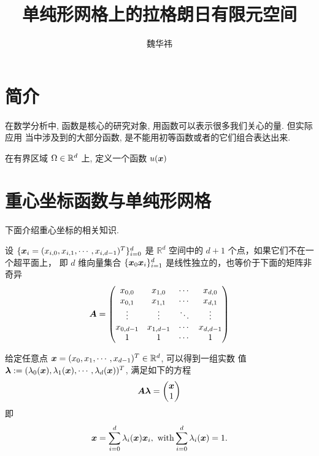 \documentclass{article}
\begin{document}
\title{单纯形网格上的拉格朗日有限元空间}
\author{魏华祎}
\date{\chntoday}
\maketitle
\section{简介}
在数学分析中, 函数是核心的研究对象, 用函数可以表示很多我们关心的量. 但实际应用
当中涉及到的大部分函数, 是不能用初等函数或者的它们组合表达出来. 

在有界区域 $\Omega \in {\mathbb R}^d$ 上, 定义一个函数 $u({\boldsymbol x})$

\section{重心坐标函数与单纯形网格}

下面介绍重心坐标的相关知识.

设 $\{{\boldsymbol x}_i = (x_{i,0}, x_{i, 1}, \cdots, x_{i, d-1})^T\}_{i=0}^{d}$ 是
$\mathbb R^d$ 空间中的 $d+1$ 个点，如果它们不在一个超平面上， 即 $d$ 维向量集合
$\{{\boldsymbol x}_0{\boldsymbol x}_i\}_{i=1}^d$ 是线性独立的，也等价于下面的矩阵非奇异
\begin{equation}
    {\boldsymbol A} =\begin{pmatrix}
        x_{0, 0} & x_{1, 0} & \cdots & x_{d, 0} \\
        x_{0, 1} & x_{1, 1} & \cdots & x_{d, 1} \\
        \vdots   & \vdots   & \ddots & \vdots \\
        x_{0, d-1} & x_{1, d-1} & \cdots & x_{d, d-1}\\
        1 & 1 & \cdots & 1
    \end{pmatrix}
\end{equation}

 
给定任意点 ${\boldsymbol x}=(x_0, x_1, \cdots, x_{d-1})^T\in \mathbb R^d$, 可以得到一组实数
值 ${\bm \lambda} := (\lambda_0({\boldsymbol x}), \lambda_1({\boldsymbol x}), \cdots, \lambda_d({\boldsymbol x}))^T$, 满足如下的方程
\begin{equation}
    {\boldsymbol A} {\bm \lambda}=
    \begin{pmatrix}
        {\boldsymbol x} \\ 1
    \end{pmatrix}
    \label{eq:lbc}
\end{equation}
即
\begin{equation}
    {\boldsymbol x} = \sum\limits_{i=0}^{d}\lambda_i({\boldsymbol x}) {\boldsymbol x}_i,
    \text{ with} \sum\limits_{i=0}^{d}\lambda_i({\boldsymbol x}) = 1.
\end{equation}
\end{document}
